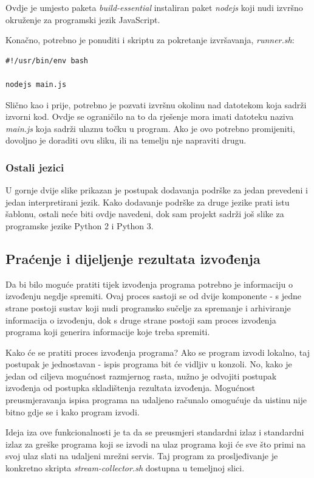 \documentclass[times, utf8, zavrsni]{fer}
\begin{document}
Ovdje je umjesto paketa {\textit{build-essential}} instaliran paket {\textit{nodejs}} koji nudi izvršno okruženje za programski jezik JavaScript.

Konačno, potrebno je ponuditi i skriptu za pokretanje izvršavanja, {\textit{runner.sh}}:

\begin{lstlisting}
#!/usr/bin/env bash

nodejs main.js
\end{lstlisting}

Slično kao i prije, potrebno je pozvati izvršnu okolinu nad datotekom koja sadrži izvorni kod. Ovdje se ograničilo na to da rješenje mora imati datoteku naziva {\textit{main.js}} koja sadrži ulaznu točku u program. Ako je ovo potrebno promijeniti, dovoljno je doraditi ovu sliku, ili na temelju nje napraviti drugu.

\subsubsection{Ostali jezici}

U gornje dvije slike prikazan je postupak dodavanja podrške za jedan prevedeni i jedan interpretirani jezik. Kako dodavanje podrške za druge jezike prati istu šablonu, ostali neće biti ovdje navedeni, dok sam projekt sadrži još slike za programske jezike Python 2 i Python 3.

\subsection{Praćenje i dijeljenje rezultata izvođenja}

Da bi bilo moguće pratiti tijek izvođenja programa potrebno je informaciju o izvođenju negdje spremiti. Ovaj proces sastoji se od dvije komponente - s jedne strane postoji sustav koji nudi programsko sučelje za spremanje i arhiviranje informacija o izvođenju, dok s druge strane postoji sam proces izvođenja programa koji generira informacije koje treba spremiti.

Kako će se pratiti proces izvođenja programa? Ako se program izvodi lokalno, taj postupak je jednostavan - ispis programa bit će vidljiv u konzoli. No, kako je jedan od ciljeva mogućnost razmjernog rasta, nužno je odvojiti postupak izvođenja od postupka skladištenja rezultata izvođenja. Mogućnost preusmjeravanja ispisa programa na udaljeno računalo omogućuje da uistinu nije bitno gdje se i kako program izvodi.

Ideja iza ove funkcionalnosti je ta da se preusmjeri standardni izlaz i standardni izlaz za greške programa koji se izvodi na ulaz programa koji će sve što primi na svoj ulaz slati na udaljeni mrežni servis. Taj program za prosljeđivanje je konkretno skripta {\textit{stream-collector.sh}} dostupna u temeljnoj slici.
\end{document}
